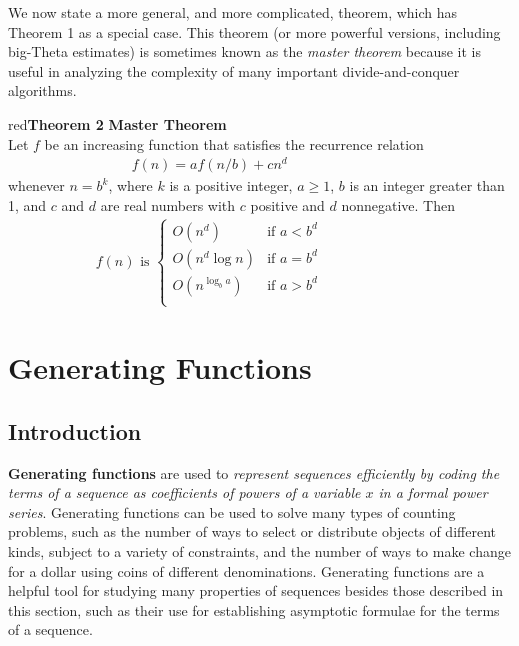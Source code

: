 \documentclass[11pt]{article}
\newenvironment{theorem}[1]{\begin{mybox}{red}{\textbf{Theorem #1}}}{\end{mybox}}
\begin{document}
\newpage
We now state a more general, and more complicated, theorem, which has Theorem 1 as a special case. This theorem (or more powerful versions, including big-Theta estimates) is sometimes known as the \textit{master theorem} because it is useful in analyzing the complexity of many important divide-and-conquer algorithms.

\begin{theorem}{2}
\textbf{Master Theorem}\\

Let $f$ be an increasing function that satisfies the recurrence relation
\begin{align*}
    f(n) = af(n/b) + cn^d & & & & & & & & &
\end{align*}
whenever $n = b^k$, where $k$ is a positive integer, $a \geq 1$, $b$ is an integer greater than 1, and $c$ and $d$ are real numbers with $c$ positive and $d$ nonnegative. Then
\begin{align*}
    f(n) \text{ is } \begin{cases}
       O(n^{d}) & \text{if } a < b^d\\
       O(n^d \log n) & \text{if } a = b^d\\
       O(n^{\log_b a}) & \text{if } a > b^d\\
    \end{cases} & & & & & & & & &
\end{align*}
\end{theorem}


\section{Generating Functions}

\subsection{Introduction}

\textbf{Generating functions} are used to \textit{represent sequences efficiently by coding the terms of a sequence as coefficients of powers of a variable $x$ in a formal power series}. Generating functions can be used to solve many types of counting problems, such as the number of ways to select or distribute objects of different kinds, subject to a variety of constraints, and the number of ways to make change for a dollar using coins of different denominations. 
Generating functions are a helpful tool for studying many properties of sequences besides those described in this section, such as their use for establishing asymptotic formulae for the terms of a sequence.
\end{document}
